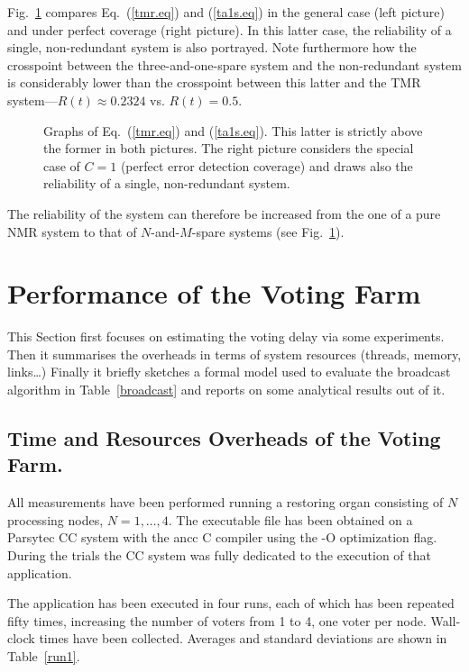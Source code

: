 \documentclass[11pt]{article}
\begin{document}
Fig.~\ref{rel} compares Eq.~(\ref{tmr.eq}) and (\ref{ta1s.eq}) in the general case
(left picture) and under perfect coverage (right picture). In this latter case,
the reliability of a single, non-redundant system is also portrayed. Note furthermore how
the crosspoint between the three-and-one-spare system and the non-redundant system
is considerably lower than the crosspoint between this latter and the TMR system---$R(t)\approx 0.2324$
vs. $R(t)=0.5$.
\begin{figure}
\hskip-1cm
\caption{Graphs of Eq.~(\ref{tmr.eq}) and (\ref{ta1s.eq}). This latter is strictly above
the former in both pictures. The right picture considers the special case of $C=1$ (perfect
error detection coverage) and draws also
the reliability of a single, non-redundant system.}
\label{rel}
\end{figure}
The reliability of the system can therefore be increased
from the one of a pure NMR system to that of $N\!$-and-$M\!$-spare
systems (see Fig.~\ref{rel}).



\section{Performance of the Voting Farm}\label{perf}
This Section first focuses on estimating the voting delay via some experiments. Then it
summarises the overheads in terms of system resources (threads, memory, links\ldots)
Finally it briefly sketches a formal model used to evaluate the broadcast algorithm
in Table~\ref{broadcast} and reports on some analytical results out of it.

\subsection{Time and Resources Overheads of the Voting Farm.}
All measurements have been performed running a restoring organ consisting
of $N$ processing nodes, $N=1,\ldots,4$.
The executable file has been obtained on a Parsytec CC system
with the {\sf ancc} C compiler using the
{\sf -O} optimization flag. During the trials the CC system was fully dedicated to the execution
of that application. 

The application has been executed in four runs, each of which
has been repeated fifty times, increasing the number of voters from
1 to 4, one voter per node.  Wall-clock times have been collected.
Averages and standard deviations are shown in Table~\ref{run1}.
\end{document}
